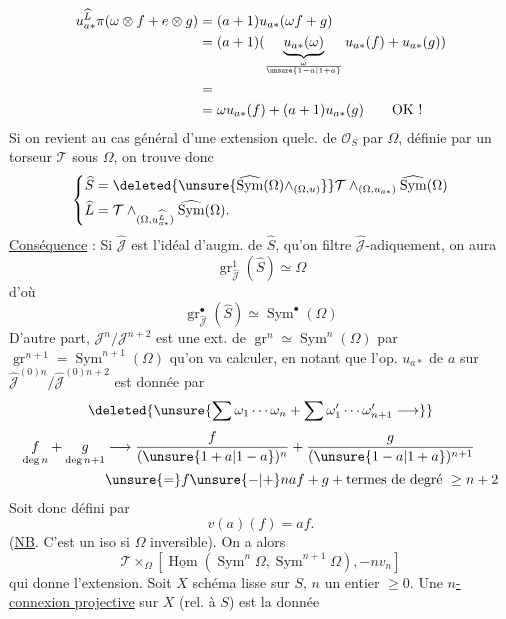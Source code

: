 \[
\begin{aligned}
u_{a*}^{\widehat L}\pi(\omega\otimes f+e\otimes g)
&=(a+1)u_{a*}(\omega f+g)\\
&=(a+1)(\underbrace{u_{a*}(\omega)}_{\frac{\omega}{\unsure{1-a|1+a}}}u_{a*}(f)+u_{a*}(g))\\
&=\\
&=\omega u_{a*}(f)+(a+1)u_{a*}(g)\qquad\text{OK !}
\end{aligned}
\]
Si on revient au cas général d'une extension quelc. de $\mathcal{O}_S$ par $\Omega$, définie par un torseur $\mathcal{T}$ sous $\Omega$, on trouve donc
\[
\left\{\begin{aligned}
\widehat S&=\deleted{\unsure{\widehat{\operatorname{Sym}}(\Omega)\wedge_{(\Omega,u)}}}\mathcal{T}\wedge_{(\Omega,u_{a*})}\widehat{\operatorname{Sym}}(\Omega)\\
\widehat L&=\mathcal{T}\wedge_{(\Omega,u_{a*}^{\widehat L})}\widehat{\operatorname{Sym}}(\Omega).
\end{aligned}\right.
\]
\uline{Conséquence} : Si $\widehat{\mathcal{J}}$ est l'idéal d'augm. de $\widehat S$, qu'on filtre $\widehat{\mathcal{J}}$-adiquement, on aura
\[
\operatorname{gr}^1_{\widehat{\mathcal{J}}}(\widehat S)\simeq\Omega
\]
d'où
\[
\operatorname{gr}^{\bullet}_{\widehat{\mathcal{J}}}(\widehat S)\simeq\operatorname{Sym}^{\bullet}(\Omega)
\]
D'autre part, $\mathcal{J}^n/\mathcal{J}^{n+2}$ est une ext. de $\operatorname{gr}^n\simeq\operatorname{Sym}^n(\Omega)$ par $\operatorname{gr}^{n+1}=\operatorname{Sym}^{n+1}(\Omega)$ qu'on va calculer, en notant que l'op. $u_{a*}$ de $a$ sur  $\widehat{\mathcal{J}}^{(0)n}/\widehat{\mathcal{J}}^{(0)n+2}$ est donnée par
\[
\deleted{\unsure{\sum\omega_1\cdots\omega_n+\sum\omega'_1\cdots\omega'_{n+1}\longrightarrow}}
\]
\[
\begin{aligned}
\underset{\deg n}{f}+\underset{\deg n+1}{g}
&\longrightarrow\frac{f}{(\unsure{1+a|1-a})^n}+\frac{g}{(\unsure{1-a|1+a})^{n+1}}\\
&\unsure{=}f\unsure{-|+}naf+g+\text{termes de degré }\geq n+2
\end{aligned}
\]
Soit donc
défini par
\[
v(a)(f)=af.
\]
(\uline{NB}. C'est un iso si $\Omega$ inversible). On a alors
\[
\mathcal{T}\times_{\Omega}[\underline{\operatorname{Hom}}(\operatorname{Sym}^n\Omega,\operatorname{Sym}^{n+1}\Omega),-nv_n]
\]
qui donne l'extension.
Soit $X$ schéma lisse sur $S$,  $n$ un entier $\geq0$. Une \uline{$n$-connexion projective} sur $X$ (rel. à $S$) est la donnée

